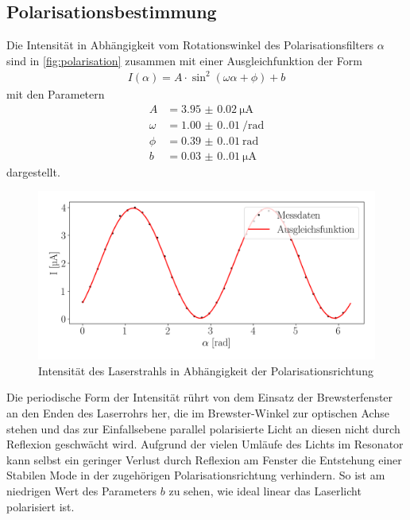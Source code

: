 \subsection{Polarisationsbestimmung}\label{subsec:polar}
Die Intensität in Abhängigkeit vom Rotationswinkel des Polarisationsfilters $\alpha$ sind in \autoref{fig:polarisation} zusammen mit einer Ausgleichfunktion der Form
\begin{align}
    I(\alpha)= A\cdot \sin^2{\left(\omega\alpha+\phi\right)}+b
\end{align}
mit den Parametern
\begin{align}
    A &= \SI{3.95(2)}{\micro\ampere} \\
    \omega &= \SI{1.00(0.01)}{\per\radian} \\
    \phi &= \SI{0.39(0.01)}{\radian} \\
    b &= \SI{0.03(0.01)}{\micro\ampere}
\end{align}
dargestellt.
\begin{figure}[H]
    \centering
    \includegraphics[scale=0.55]{Skripte/polarisation.png}
    \caption{Intensität des Laserstrahls in Abhängigkeit der Polarisationsrichtung}\label{fig:polarisation}
\end{figure}
Die periodische Form der Intensität rührt von dem Einsatz der Brewsterfenster an den Enden des Laserrohrs her, die im Brewster-Winkel zur optischen Achse stehen und das zur Einfallsebene parallel polarisierte Licht an diesen nicht durch Reflexion geschwächt wird. Aufgrund der vielen Umläufe des Lichts im Resonator kann selbst ein geringer Verlust durch Reflexion am Fenster die Entstehung einer Stabilen Mode in der zugehörigen Polarisationsrichtung verhindern.
So ist am niedrigen Wert des Parameters $b$ zu sehen, wie ideal linear das Laserlicht polarisiert ist.
